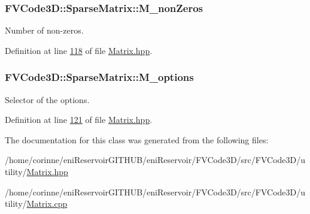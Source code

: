 \subsubsection[{\texorpdfstring{M\+\_\+non\+Zeros}{M_nonZeros}}]{ F\+V\+Code3\+D\+::\+Sparse\+Matrix\+::\+M\+\_\+non\+Zeros\hspace{0.3cm}{\ttfamily [private]}}\hypertarget{classFVCode3D_1_1SparseMatrix_a4c0c92274503986d2f529a39d50c2efd}{}\label{classFVCode3D_1_1SparseMatrix_a4c0c92274503986d2f529a39d50c2efd}


Number of non-\/zeros. 



Definition at line \hyperlink{Matrix_8hpp_source_l00118}{118} of file \hyperlink{Matrix_8hpp_source}{Matrix.\+hpp}.

\subsubsection[{\texorpdfstring{M\+\_\+options}{M_options}}]{ F\+V\+Code3\+D\+::\+Sparse\+Matrix\+::\+M\+\_\+options\hspace{0.3cm}{\ttfamily [private]}}\hypertarget{classFVCode3D_1_1SparseMatrix_ae83070ee319a49c35bf64bc0af03868f}{}\label{classFVCode3D_1_1SparseMatrix_ae83070ee319a49c35bf64bc0af03868f}


Selector of the options. 



Definition at line \hyperlink{Matrix_8hpp_source_l00121}{121} of file \hyperlink{Matrix_8hpp_source}{Matrix.\+hpp}.



The documentation for this class was generated from the following files\+:\begin{DoxyCompactItemize}
\item 
/home/corinne/eni\+Reservoir\+G\+I\+T\+H\+U\+B/eni\+Reservoir/\+F\+V\+Code3\+D/src/\+F\+V\+Code3\+D/utility/\hyperlink{Matrix_8hpp}{Matrix.\+hpp}\item 
/home/corinne/eni\+Reservoir\+G\+I\+T\+H\+U\+B/eni\+Reservoir/\+F\+V\+Code3\+D/src/\+F\+V\+Code3\+D/utility/\hyperlink{Matrix_8cpp}{Matrix.\+cpp}\end{DoxyCompactItemize}
